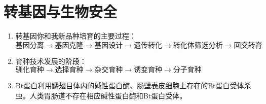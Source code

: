 \section{转基因与生物安全}
\begin{enumerate}
    \item 转基因你和我新品种培育的主要过程：$\text{基因分离}\longrightarrow\text{基因克隆}\longrightarrow\text{基因设计}\longrightarrow\text{遗传转化}\longrightarrow\text{转化体筛选分析}\longrightarrow\text{回交转育}$
    \item 育种技术发展的阶段：$\text{驯化育种}\longrightarrow\text{选择育种}\longrightarrow\text{杂交育种}\longrightarrow\text{诱变育种}\longrightarrow\text{分子育种}$
    \item Bt蛋白利用鳞翅目体内的碱性蛋白酶、肠壁表皮细胞上存在的Bt蛋白受体杀虫。人类胃肠道不存在相应碱性蛋白酶和Bt蛋白受体。
\end{enumerate}